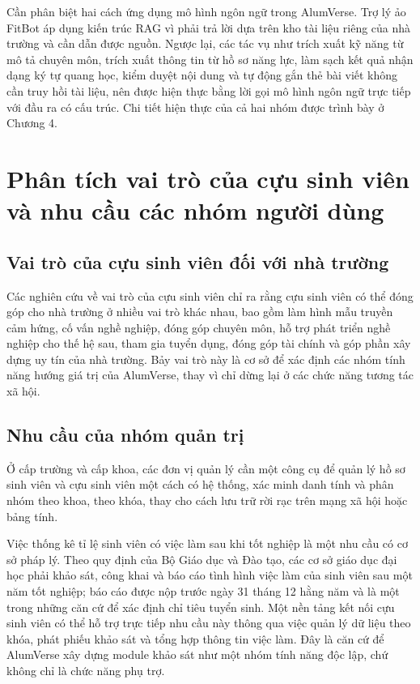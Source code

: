 \documentclass[12pt,a4paper,oneside]{report}
\begin{document}
Cần phân biệt hai cách ứng dụng mô hình ngôn ngữ trong AlumVerse. Trợ lý ảo FitBot áp dụng kiến trúc RAG vì phải trả lời dựa trên kho tài liệu riêng của nhà trường và cần dẫn được nguồn. Ngược lại, các tác vụ như trích xuất kỹ năng từ mô tả chuyên môn, trích xuất thông tin từ hồ sơ năng lực, làm sạch kết quả nhận dạng ký tự quang học, kiểm duyệt nội dung và tự động gắn thẻ bài viết không cần truy hồi tài liệu, nên được hiện thực bằng lời gọi mô hình ngôn ngữ trực tiếp với đầu ra có cấu trúc. Chi tiết hiện thực của cả hai nhóm được trình bày ở Chương 4.

\section{Phân tích vai trò của cựu sinh viên và nhu cầu các nhóm người dùng}

\subsection{Vai trò của cựu sinh viên đối với nhà trường}

Các nghiên cứu về vai trò của cựu sinh viên chỉ ra rằng cựu sinh viên có thể đóng góp cho nhà trường ở nhiều vai trò khác nhau, bao gồm làm hình mẫu truyền cảm hứng, cố vấn nghề nghiệp, đóng góp chuyên môn, hỗ trợ phát triển nghề nghiệp cho thế hệ sau, tham gia tuyển dụng, đóng góp tài chính và góp phần xây dựng uy tín của nhà trường. Bảy vai trò này là cơ sở để xác định các nhóm tính năng hướng giá trị của AlumVerse, thay vì chỉ dừng lại ở các chức năng tương tác xã hội.

\subsection{Nhu cầu của nhóm quản trị}

Ở cấp trường và cấp khoa, các đơn vị quản lý cần một công cụ để quản lý hồ sơ sinh viên và cựu sinh viên một cách có hệ thống, xác minh danh tính và phân nhóm theo khoa, theo khóa, thay cho cách lưu trữ rời rạc trên mạng xã hội hoặc bảng tính.

Việc thống kê tỉ lệ sinh viên có việc làm sau khi tốt nghiệp là một nhu cầu có cơ sở pháp lý. Theo quy định của Bộ Giáo dục và Đào tạo, các cơ sở giáo dục đại học phải khảo sát, công khai và báo cáo tình hình việc làm của sinh viên sau một năm tốt nghiệp; báo cáo được nộp trước ngày 31 tháng 12 hằng năm và là một trong những căn cứ để xác định chỉ tiêu tuyển sinh. Một nền tảng kết nối cựu sinh viên có thể hỗ trợ trực tiếp nhu cầu này thông qua việc quản lý dữ liệu theo khóa, phát phiếu khảo sát và tổng hợp thông tin việc làm. Đây là căn cứ để AlumVerse xây dựng module khảo sát như một nhóm tính năng độc lập, chứ không chỉ là chức năng phụ trợ.
\end{document}
